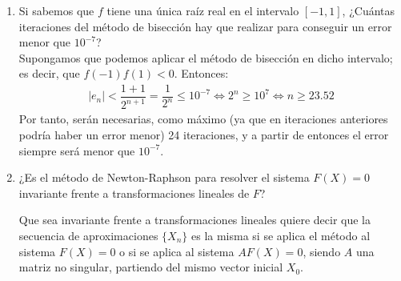 \begin{ejercicio}
\begin{enumerate}
\begin{comment}
            =\\&= \dfrac{(x-s)^{-2m+2}q(x)}{[mq(x)+(x-s)q'(x)]^2}
            \cdot\left[ \dfrac{(m-1)}{mq(x)+(x-s)q'(x)}\right.
            +\\&\hspace{2cm}\left.+ \dfrac{(x-s)[(m+1)q'(x)+(x-s)q''(x)]}{[mq(x)+(x-s)q'(x)]^2}\right]
        \end{align*}
        Calculamos ahora cada una de las derivadas de $g$ evaluadas en $s$:
        \begin{align*}
            g(s) &= s-\dfrac{0}{mq(s)} = s\\
            g'(s) &= \dfrac{0^{-2m+2}}{m^2q(s)}
            \cdot\left[ \dfrac{(m-1)}{mq(s)}
            + \dfrac{0}{[mq(s)]^2}\right]
            \\
            g''(s) &= \dfrac{[f'(s)f''(s)+f(s)f'''(s)]f'(s)^2 - 2f(s)f''(s)f'(s)f''(s)}{f'(s)^4}
            =\\&= \dfrac{f'(s)^3f''(s)}{f'(s)^4} = \dfrac{f''(s)}{f'(s)}
        \end{align*}

        Por tanto, si $f''(s)=0$, es decir, si $s$ es al menos 
        \end{comment}
        \item Si sabemos que $f$ tiene una única raíz real en el intervalo $[-1, 1]$, ¿Cuántas iteraciones del método de bisección hay que realizar para conseguir un error menor que $10^{-7}$?\\
        
        Supongamos que podemos aplicar el método de bisección en dicho intervalo; es decir, que $f(-1)f(1)<0$. Entonces:
        \begin{align*}
            |e_n| < \dfrac{1+1}{2^{n+1}} = \dfrac{1}{2^n}\leq10^{-7}
            \iff 2^n\geq 10^7\iff n\geq 23.52
        \end{align*}
        Por tanto, serán necesarias, como máximo (ya que en iteraciones anteriores podría haber un error menor) 24 iteraciones, y a partir de entonces el error siempre será menor que $10^{-7}$.
        \item ¿Es el método de Newton-Raphson para resolver el sistema $F(X) = 0$ invariante frente a transformaciones lineales de $F$?
        \begin{observacion}
            Que sea invariante frente a transformaciones lineales quiere decir que la secuencia de aproximaciones $\{X_n\}$ es la misma si se aplica el método al sistema $F(X) = 0$ o si se aplica al sistema $AF(X) = 0$, siendo $A$ una matriz no singular, partiendo del mismo vector inicial $X_0$.
        \end{observacion}

    \end{enumerate}
\end{ejercicio}

